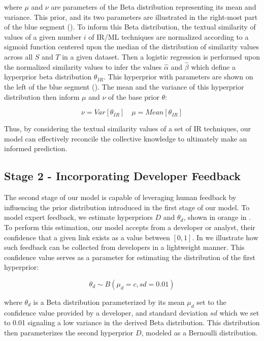 \noindent where $\mu$ and $\nu$ are parameters of the Beta distribution representing its mean and variance. This prior, and its two parameters are illustrated in the right-most part of the blue segment (). To inform this Beta distribution, the textual similarity of values of a given number $i$ of IR/ML techniques are normalized according to a sigmoid function centered upon the median of the distribution of similarity values across all $S$ and $T$ in a given dataset. Then a logistic regression is performed upon the normalized similarity values to infer the values $\hat{\alpha}$ and $\hat{\beta}$ which define a hyperprior beta distribution $\theta_{IR}$. This hyperprior with parameters are shown on the left of the blue segment (). The mean and the variance of this hyperprior distribution then inform $\mu$ and $\nu$ of the base prior $\theta$:


\begin{equation}\label{eq:lvl1-params}
\nu = Var[\theta_{IR}] \quad \mu = Mean[\theta_{IR}]
\end{equation}

Thus, by considering the textual similarity values of a set of IR techniques, our model can effectively reconcile the collective knowledge to ultimately make an informed prediction.

\subsection{Stage 2 - Incorporating Developer Feedback}
\label{sub:model-comp2}

The second stage of our model is capable of leveraging human feedback by influencing the prior distribution introduced in the first stage of our model. To model expert feedback, we estimate hyperpriors $D$ and $\theta_d$, shown in orange in . To perform this estimation, our model accepts from a developer or analyst, their confidence that a given link exists as a value between $[0,1]$. In  we illustrate how such feedback can be collected from developers in a lightweight manner. This confidence value serves as a parameter for estimating the distribution of the first hyperprior:

\begin{equation}
\theta_{d} \sim B(\mu_{d}=c,sd=0.01)	
\end{equation}

\noindent where $\theta_{d}$ is a Beta distribution parameterized by its mean $\mu_d$ set to the confidence value provided by a developer, and standard deviation $sd$ which we set to 0.01 signaling a low variance in the derived Beta distribution. This distribution then parameterizes the second hyperprior $D$, modeled as a Bernoulli distribution.

